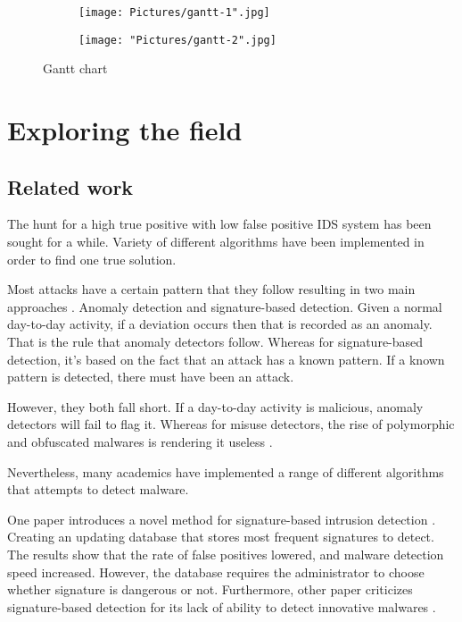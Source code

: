 \documentclass[11pt]{article}
\begin{document}
\begin{figure}[!p]
    \centering
    \begin{subfigure}{\linewidth}
      \texttt{[image: Pictures/gantt-1".jpg]}
    \end{subfigure}
    \begin{subfigure}{\linewidth}
      \texttt{[image: "Pictures/gantt-2".jpg]}
    \end{subfigure}
    \caption{Gantt chart}
    \label{fig:image10}
\end{figure}

\newpage
\section{Exploring the field}
\subsection{Related work}
The hunt for a high true positive with low false positive IDS system has been sought for a while. Variety of different algorithms have been implemented in order to find one true solution. 

Most attacks have a certain pattern that they follow resulting in two main approaches \cite{related-work-main-approaches}. Anomaly detection and signature-based detection. Given a normal day-to-day activity, if a deviation occurs then that is recorded as an anomaly. That is the rule that anomaly detectors follow. Whereas for signature-based detection, it’s based on the fact that an attack has a known pattern. If a known pattern is detected, there must have been an attack.

However, they both fall short. If a day-to-day activity is malicious, anomaly detectors will fail to flag it. Whereas for misuse detectors, the rise of polymorphic and obfuscated malwares is rendering it useless \cite{related-work-main-approaches}.

Nevertheless, many academics have implemented a range of different algorithms that attempts to detect malware. 

One paper introduces a novel method for signature-based intrusion detection \cite{related-work-signature-based}. Creating an updating database that stores most frequent signatures to detect. The results show that the rate of false positives lowered, and malware detection speed increased. However, the database requires the administrator to choose whether signature is dangerous or not. Furthermore, other paper criticizes signature-based detection for its lack of ability to detect innovative malwares \cite{related-work-criticise-signature}. 
 
\end{document}
